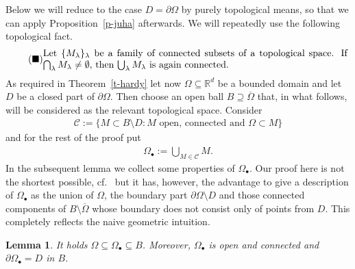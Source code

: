 \documentclass[10pt,leqno]{amsart}
\newtheorem{lemma}[theorem]{Lemma}
\theoremstyle{definition}
\numberwithin{equation}{section}
\begin{document}
Below we will reduce to the case $D = \partial \Omega$ by purely topological
means, so that we can apply Proposition~\ref{p-juha} afterwards. We will
repeatedly use the following topological fact.
\begin{align} \label{blacksquare}
\tag{$\blacksquare$} 
\begin{minipage}{0.92\textwidth}{Let $\{M_\lambda\}_{\lambda }$
be a family of connected subsets of a topological space. If $\bigcap_{\lambda }
M_\lambda \neq \emptyset$, then $\bigcup_{\lambda } M_\lambda$ is again
connected.} 
\end{minipage}
\end{align}
As required in Theorem~\ref{t-hardy} let now $\Omega \subseteq {{\mathbb R}}^d$ be a
bounded domain and let $D$ be a closed part of $\partial \Omega$. Then choose an
open ball $B \supseteq \overline \Omega$ that, in what follows, will be
considered as the relevant topological space. Consider
\begin{align*}
 \mathcal C := \{ M \subset B \setminus D : M \text{ open, connected
	and } \Omega \subset M \}
\end{align*}
and for the rest of the proof put
\begin{align*}
 \Omega_\bullet :=
	\bigcup_{M \in \mathcal C} M.
\end{align*}
In the subsequent lemma we collect some properties of $\Omega_\bullet$.
Our proof here is not the shortest possible, cf.\ \cite[Lem.\
6.4]{auschhallreh} but it has, however, the advantage to give a description
of $\Omega_\bullet$ as the union of $\Omega$, the boundary part $\partial
\Omega \setminus D$ and those connected components of $B \setminus \overline
\Omega$ whose boundary does not consist only of points from $D$. This completely
reflects the naive geometric intuition.

\begin{lemma} \label{l-1}
It holds $\Omega \subseteq \Omega_\bullet \subseteq B$. Moreover,
$\Omega_\bullet$ is open and connected and $\partial \Omega_\bullet = D$ in $B$.
\end{lemma}
\end{document}
